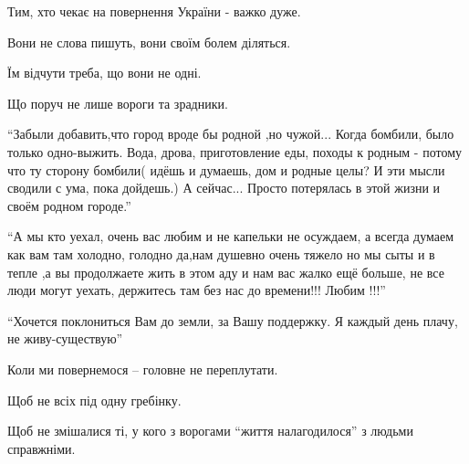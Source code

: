 Тим, хто чекає на повернення України - важко дуже.

Вони не слова пишуть, вони своїм болем діляться.

Їм відчути треба, що вони не одні. 

Що поруч не лише вороги та зрадники.

\enquote{Забыли добавить,что город вроде бы родной ,но чужой... Когда бомбили, было
только одно-выжить. Вода, дрова, приготовление еды, походы к родным - потому что
ту сторону бомбили( идёшь и думаешь, дом и родные целы? И эти мысли сводили с
ума, пока дойдешь.) А сейчас... Просто потерялась в этой жизни и своём родном
городе.}

\enquote{А мы кто уехал, очень вас любим и не капельки не осуждаем, а всегда думаем
как вам там холодно, голодно да,нам душевно очень тяжело но мы сыты и в тепле
,а вы продолжаете жить в этом аду и нам вас жалко ещё больше, не все люди могут
уехать, держитесь там без нас до времени!!! Любим !!!}

\enquote{Хочется поклониться Вам до земли, за Вашу поддержку. Я каждый день плачу, не
живу-существую}

Коли ми повернемося – головне не переплутати.

Щоб не всіх під одну гребінку.

Щоб не змішалися ті, у кого з ворогами \enquote{життя налагодилося} з людьми
справжніми.
